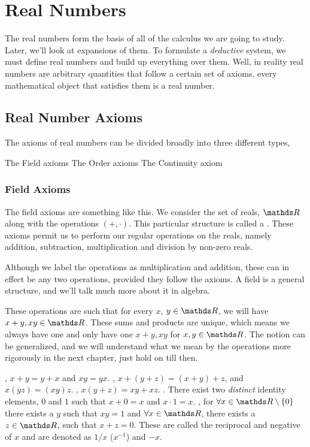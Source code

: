 \chapter{Real Numbers}

The real numbers form the basis of all of the calculus we are going to study. Later, we'll look at expansions of them.
To formulate a \emph{deductive} system, we must define real numbers and build up everything over them. Well, in reality
real numbers are arbitrary quantities that follow a certain set of axioms, every mathematical object that satisfies
them is a real number.

\section{Real Number Axioms}

The axioms of real numbers can be divided broadly into three different types,

\begin{itemize}
    \ii The Field axioms
    \ii The Order axioms
    \ii The Continuity axiom
\end{itemize}

\subsection{Field Axioms}

The field axioms are something like this. We consider the set of reals, \(\RR\)
along with the operations \((+, \cdot)\). This particular structure is called a 
. These axioms permit us to perform our regular operations on 
the reals, namely addition, subtraction, multiplication and division by non-zero
reals.

Although we label the operations as multiplication and addition, these can in effect be 
any two operations, provided they follow the axioms. A field is a general structure, 
and we'll talk much more about it in algebra.

These operations are such that for every \(x\), \(y \in \RR\), we will have \(x + y, xy \in \RR\). 
These sums and products are unique, which means we always have one and only have one 
\(x+y, xy\) for \(x, y \in \RR\). The notion can be generalized, and we will understand what we mean by 
the operations more rigorously in the next chapter, just hold on till then.

\begin{axioms}
    \ii {}, \(x+y = y+x\) and \(xy = yx\).
    \ii {}, \(x + (y+z) = (x+y) + z\), and \(x(yz) = (xy)z\).
    \ii {}, \(x(y + z) = xy + xz\).
    \ii {}. There exist two \emph{distinct} identity elements, \(0\) and \(1\) such that \(x + 0 = x\) and \(x \cdot 1 = x\).
    \ii {}, for \(\forall x \in \RR \setminus \{0\}\) there exists a \(y\) such that \(xy = 1\) and \(\forall x \in \RR\),
    there exists a \(z \in \RR\), such that \(x + z = 0\). These are called the reciprocal 
    and negative of \(x\) and are denoted as \(1/x\)  (\(x^{-1}\)) and \(-x\).
\end{axioms}
 
